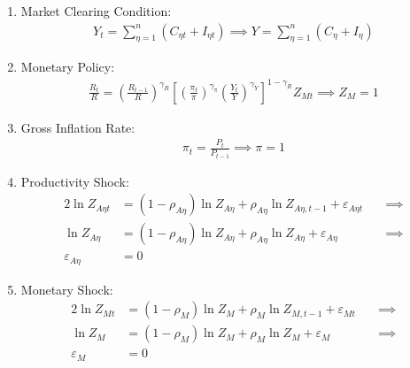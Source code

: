 \documentclass[
	thesis.tex
	]{subfiles}
\begin{document}
\begin{enumerate}
	\item Market Clearing Condition:
	\begin{align}
		Y_t = \sum_{\eta=1}^{n} (C_{\eta t} + I_{\eta t}) \implies Y = \sum_{\eta=1}^{n} (C_{\eta} + I_{\eta}) \label{eq:reg-ss-market-clearing-condition}
	\end{align}
	
	\item Monetary Policy:
	\begin{align}
		\label{eq:reg-ss-monetary-policy}
		\frac{R_t}{R} =
		\left( \frac{R_{t-1}}{R} \right)^{\gamma_R}  \left[
		\left( \frac{\pi_t}{\pi} \right)^{\gamma_\pi}
		\left( \frac{Y_t}{Y} \right)^{\gamma_Y} \right]^{1-\gamma_R} Z_{Mt}
		\implies Z_{M} = 1
	\end{align}
	
	\item Gross Inflation Rate:
	\begin{align}
		\label{eq:reg-ss-gross-inflation-rate}
		\pi_t = \frac{P_t}{P_{t-1}} \implies \pi = 1
	\end{align}
	
	\item Productivity Shock:
	\begin{alignat}{2}
		\ln{Z_{A\eta t}} &= (1 -\rho_{A\eta}) \ln{Z_{A\eta}} + \rho_{A\eta} \ln{Z_{A\eta,t-1}} + \varepsilon_{A\eta t} \quad &\implies \nonumber \\
		\ln{Z_{A\eta}} &= (1 -\rho_{A\eta}) \ln{Z_{A\eta}} + \rho_{A\eta} \ln{Z_{A\eta}} + \varepsilon_{A\eta} &\implies \nonumber \\
		\varepsilon_{A\eta} &= 0 \label{eq:reg-ss-productivity-shock}
	\end{alignat}
	
	\item Monetary Shock:
	\begin{alignat}{2}
		\ln{Z_{Mt}} &= (1-\rho_M)\ln{Z_{M}} + \rho_M\ln{Z_{M,t-1}} + \varepsilon_{Mt} \quad &\implies \nonumber \\
		\ln{Z_{M}} &= (1-\rho_M)\ln{Z_{M}} + \rho_M\ln{Z_{M}} + \varepsilon_{M} &\implies \nonumber \\
		\varepsilon_{M} &= 0 \label{eq:reg-ss-monetary-shock}
	\end{alignat}
	
\end{enumerate}

\end{document}
